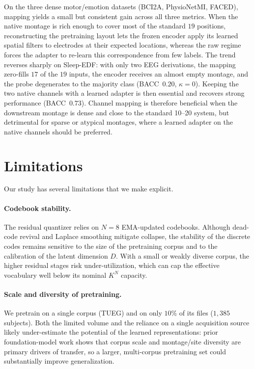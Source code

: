 \documentclass{article}
\begin{document}
On the three dense motor/emotion datasets (BCI2A, PhysioNetMI, FACED),
mapping yields a small but consistent gain across all three metrics. When the
native montage is rich enough to cover most of the standard $19$ positions,
reconstructing the pretraining layout lets the frozen encoder apply its
learned spatial filters to electrodes at their expected locations, whereas the
raw regime forces the adapter to re-learn this correspondence from few labels.
The trend reverses sharply on Sleep-EDF: with only two EEG derivations, the
mapping zero-fills $17$ of the $19$ inputs, the encoder receives an almost
empty montage, and the probe degenerates to the majority class
(BACC~$0.20$, $\kappa\!=\!0$). Keeping the two native channels with a learned
adapter is then essential and recovers strong performance
(BACC~$0.73$). Channel mapping is therefore beneficial when the downstream
montage is dense and close to the standard 10--20 system, but detrimental for
sparse or atypical montages, where a learned adapter on the native channels
should be preferred.






\section{Limitations}

Our study has several limitations that we make explicit.

\paragraph{Codebook stability.}
The residual quantizer relies on $N=8$ EMA-updated codebooks.
Although dead-code revival and Laplace smoothing mitigate collapse, the stability of the discrete codes remains sensitive to the size of the pretraining corpus and to the calibration of the latent dimension $D$.
With a small or weakly diverse corpus, the higher residual stages risk under-utilization, which can cap the effective vocabulary well below its nominal $K^N$ capacity.

\paragraph{Scale and diversity of pretraining.}
We pretrain on a single corpus (TUEG) and on only $10\%$ of its files ($1{,}385$ subjects).
Both the limited volume and the reliance on a single acquisition source likely under-estimate the potential of the learned representations: prior foundation-model work shows that corpus scale and montage/site diversity are primary drivers of transfer, so a larger, multi-corpus pretraining set could substantially improve generalization.
\end{document}
